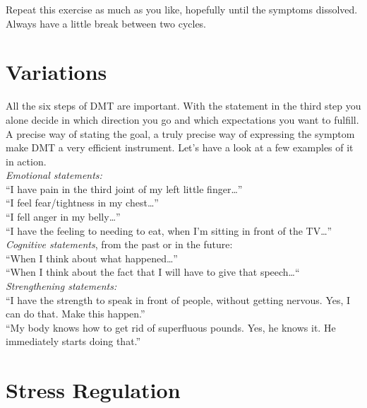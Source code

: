 \documentclass[../main.tex]{subfiles}
\begin{document}
Repeat this exercise as much as you like, hopefully until the symptoms dissolved.
Always have a little break between two cycles.

\section{Variations}

All the six steps of DMT are important.
With the statement in the third step you alone decide in which direction you go and which expectations you want to fulfill.
A precise way of stating the goal, a truly precise way of expressing the symptom make DMT a very efficient instrument.
Let's have a look at a few examples of it in action.\\

\noindent \emph{Emotional statements:}\\
``I have pain in the third joint of my left little finger\ldots''\\
``I feel fear/tightness in my chest\ldots''\\
``I fell anger in my belly\ldots''\\
``I have the feeling to needing to eat, when I'm sitting in front of the TV\ldots''\\

\noindent \emph{Cognitive statements}, from the past or in the future:\\
``When I think about what happened\ldots''\\
``When I think about the fact that I  will have to give that speech\ldots``\\

\noindent \emph{Strengthening statements:}\\
``I have the strength to speak in front of people, without getting nervous. Yes, I can do that. Make this happen.''\\
``My body knows how to get rid of superfluous pounds. Yes, he knows it. He immediately starts doing that.''

\section{Stress Regulation}
\end{document}
